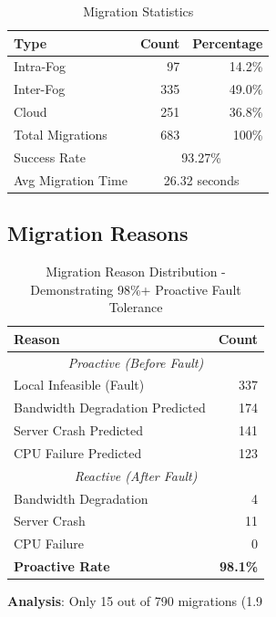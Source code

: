 \documentclass[12pt,a4paper]{article}
\begin{document}
\begin{table}[h]
\centering
\begin{tabular}{@{}lrr@{}}
\toprule
\textbf{Type} & \textbf{Count} & \textbf{Percentage} \\ \midrule
Intra-Fog & 97 & 14.2\% \\
Inter-Fog & 335 & 49.0\% \\
Cloud & 251 & 36.8\% \\
Total Migrations & 683 & 100\% \\ \midrule
Success Rate & \multicolumn{2}{c}{93.27\%} \\
Avg Migration Time & \multicolumn{2}{c}{26.32 seconds} \\ \bottomrule
\end{tabular}
\caption{Migration Statistics}
\end{table}

\subsection{Migration Reasons}

\begin{table}[h]
\centering
\begin{tabular}{@{}lr@{}}
\toprule
\textbf{Reason} & \textbf{Count} \\ \midrule
\multicolumn{2}{c}{\textit{Proactive (Before Fault)}} \\
Local Infeasible (Fault) & 337 \\
Bandwidth Degradation Predicted & 174 \\
Server Crash Predicted & 141 \\
CPU Failure Predicted & 123 \\
\midrule
\multicolumn{2}{c}{\textit{Reactive (After Fault)}} \\
Bandwidth Degradation & 4 \\
Server Crash & 11 \\
CPU Failure & 0 \\
\midrule
\textbf{Proactive Rate} & \textbf{98.1\%} \\ \bottomrule
\end{tabular}
\caption{Migration Reason Distribution - Demonstrating 98\%+ Proactive Fault Tolerance}
\end{table}

\textbf{Analysis}: Only 15 out of 790 migrations (1.9\\%
\end{document}
